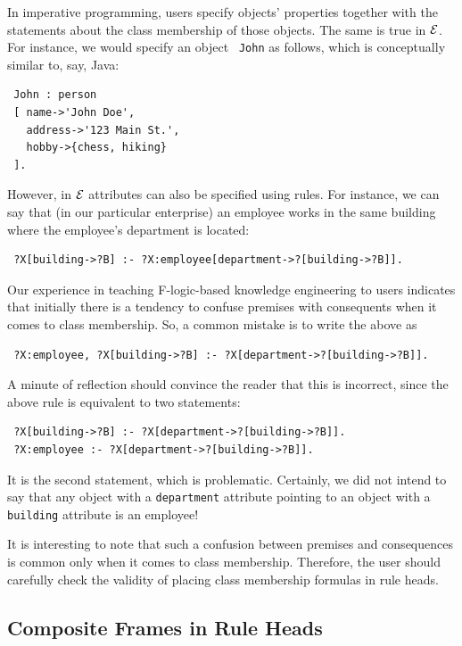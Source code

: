 \documentclass[11pt]{article}
\newcommand{\ERGO}{\mbox{\ensuremath{\cal{E}}\smaller{{\sc{RGO}}}}\xspace}
\newcommand{\FLSYSTEM}{\ERGO}
\begin{document}
In imperative programming, users specify objects' properties together with
the statements about the class membership of those objects.
The same is true in \FLSYSTEM. For instance, we would specify an object {\tt
  John} as follows, which is conceptually similar to, say, Java:
\begin{verbatim}
 John : person
 [ name->'John Doe',
   address->'123 Main St.',
   hobby->{chess, hiking}
 ].
\end{verbatim}
However, in \FLSYSTEM attributes can also be specified using rules. For
instance, we can say that (in our particular enterprise)
an employee works in the same building where the employee's department is
located:
\begin{verbatim}
 ?X[building->?B] :- ?X:employee[department->?[building->?B]].  
\end{verbatim}
Our experience in teaching F-logic-based knowledge engineering
to users indicates that
initially there is a tendency to confuse premises with consequents when it
comes to class membership. So, a common mistake is to write the above as
\begin{verbatim}
 ?X:employee, ?X[building->?B] :- ?X[department->?[building->?B]].  
\end{verbatim}
A minute of reflection should convince the reader that this is incorrect, since
the above rule is equivalent to two statements:
\begin{verbatim}
 ?X[building->?B] :- ?X[department->?[building->?B]].  
 ?X:employee :- ?X[department->?[building->?B]].
\end{verbatim}
It is the second statement, which is problematic. Certainly, we did not
intend to say that any object with a {\tt department} attribute pointing to
an object with a {\tt building} attribute is an employee!

It is interesting to note that such a confusion between premises and
consequences is common only when it comes to class membership. Therefore,
the user should carefully check the validity of placing class membership
formulas in rule heads.

\subsection{Composite Frames in Rule Heads}
\end{document}
